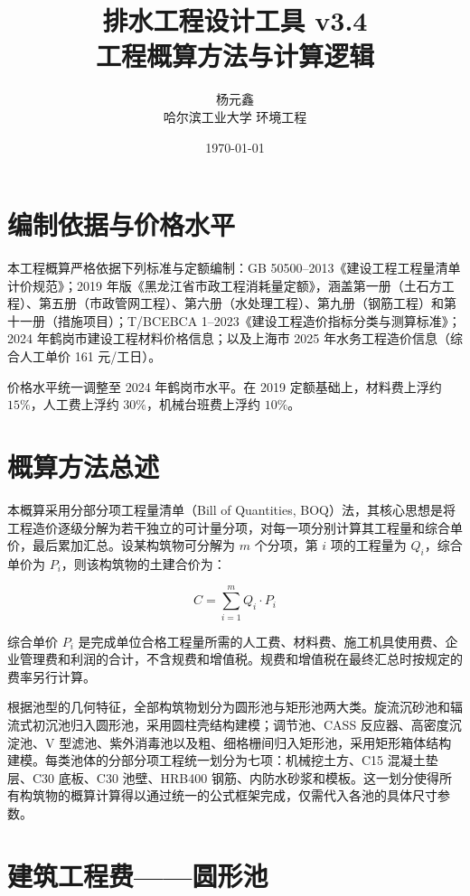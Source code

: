 \documentclass[12pt,a4paper]{ctexart}
\title{排水工程设计工具 v3.4\\工程概算方法与计算逻辑}
\author{杨元鑫 \\ 哈尔滨工业大学 环境工程}
\date{\today}
\begin{document}
\maketitle
\tableofcontents
\newpage

\section{编制依据与价格水平}

本工程概算严格依据下列标准与定额编制：GB 50500--2013《建设工程工程量清单计价规范》；2019 年版《黑龙江省市政工程消耗量定额》，涵盖第一册（土石方工程）、第五册（市政管网工程）、第六册（水处理工程）、第九册（钢筋工程）和第十一册（措施项目）；T/BCEBCA 1--2023《建设工程造价指标分类与测算标准》；2024 年鹤岗市建设工程材料价格信息；以及上海市 2025 年水务工程造价信息（综合人工单价 161 元/工日）。

价格水平统一调整至 2024 年鹤岗市水平。在 2019 定额基础上，材料费上浮约 $15\%$，人工费上浮约 $30\%$，机械台班费上浮约 $10\%$。

\section{概算方法总述}

本概算采用分部分项工程量清单（Bill of Quantities, BOQ）法，其核心思想是将工程造价逐级分解为若干独立的可计量分项，对每一项分别计算其工程量和综合单价，最后累加汇总。设某构筑物可分解为 $m$ 个分项，第 $i$ 项的工程量为 $Q_i$，综合单价为 $P_i$，则该构筑物的土建合价为：

\begin{equation}
C = \sum_{i=1}^{m} Q_i \cdot P_i
\end{equation}

综合单价 $P_i$ 是完成单位合格工程量所需的人工费、材料费、施工机具使用费、企业管理费和利润的合计，不含规费和增值税。规费和增值税在最终汇总时按规定的费率另行计算。

根据池型的几何特征，全部构筑物划分为圆形池与矩形池两大类。旋流沉砂池和辐流式初沉池归入圆形池，采用圆柱壳结构建模；调节池、CASS 反应器、高密度沉淀池、V 型滤池、紫外消毒池以及粗、细格栅间归入矩形池，采用矩形箱体结构建模。每类池体的分部分项工程统一划分为七项：机械挖土方、C15 混凝土垫层、C30 底板、C30 池壁、HRB400 钢筋、内防水砂浆和模板。这一划分使得所有构筑物的概算计算得以通过统一的公式框架完成，仅需代入各池的具体尺寸参数。

\section{建筑工程费——圆形池}
\end{document}
